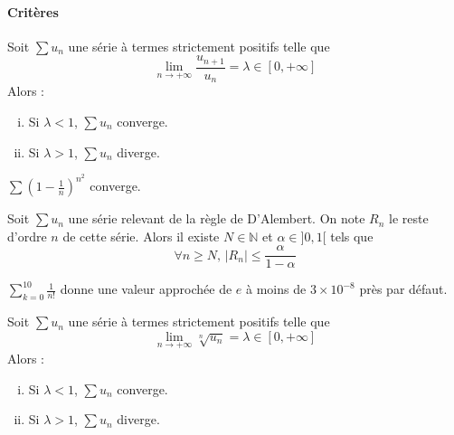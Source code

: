 	\paragraph{Critères}
	
	\begin{proposition}
		Soit $\sum u_n$ une série à termes strictement positifs telle que
		\[ \lim_{n \rightarrow +\infty} \frac{u_{n+1}}{u_n} = \lambda \in [0, +\infty] \]
		Alors :
		\begin{enumerate}[(i)]
			\item Si $\lambda < 1$, $\sum u_n$ converge.
			\item Si $\lambda > 1$, $\sum u_n$ diverge.
		\end{enumerate}
	\end{proposition}
	
	
	\begin{example}
		$\sum \left( 1 - \frac{1}{n} \right)^{n^2}$ converge.
	\end{example}
	
	
	\begin{proposition}
		Soit $\sum u_n$ une série relevant de la règle de D'Alembert. On note $R_n$ le reste d'ordre $n$ de cette série. Alors il existe $N \in \mathbb{N}$ et $\alpha \in ]0,1[$ tels que
		\[ \forall n \geq N, \, |R_n| \leq \frac{\alpha}{1-\alpha} \]
	\end{proposition}
	
	\begin{example}
		$\sum_{k=0}^{10} \frac{1}{n!}$ donne une valeur approchée de $e$ à moins de $3 \times 10^{-8}$ près par défaut.
	\end{example}
	
	
	\begin{proposition}
		Soit $\sum u_n$ une série à termes strictement positifs telle que
		\[ \lim_{n \rightarrow +\infty} \sqrt[n]{u_n} = \lambda \in [0, +\infty] \]
		Alors :
		\begin{enumerate}[(i)]
			\item Si $\lambda < 1$, $\sum u_n$ converge.
			\item Si $\lambda > 1$, $\sum u_n$ diverge.
		\end{enumerate}
	\end{proposition}
	
	
